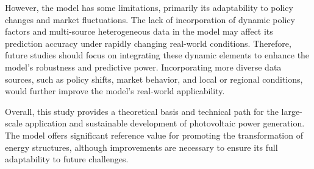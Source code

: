\documentclass{article}
\begin{document}
	However, the model has some limitations, primarily its adaptability to policy changes and market fluctuations. The lack of incorporation of dynamic policy factors and multi-source heterogeneous data in the model may affect its prediction accuracy under rapidly changing real-world conditions. Therefore, future studies should focus on integrating these dynamic elements to enhance the model's robustness and predictive power. Incorporating more diverse data sources, such as policy shifts, market behavior, and local or regional conditions, would further improve the model's real-world applicability.
	
	Overall, this study provides a theoretical basis and technical path for the large-scale application and sustainable development of photovoltaic power generation. The model offers significant reference value for promoting the transformation of energy structures, although improvements are necessary to ensure its full adaptability to future challenges.
	
\end{document}

